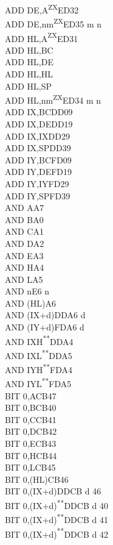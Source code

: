 \documentclass[12pt,twoside,openright,a4paper]{book}
\newcommand{\UNDOC}{\textnormal{\textsuperscript{**}}}
\newcommand{\ZXN}{\textnormal{\textsuperscript{ZX}}}
\begin{document}
\begin{multicols}{3}
{\begin{tabbing}
		ADD DE,A\ZXN\>ED32\\
		ADD DE,nm\ZXN\>ED35 m n\\
		ADD HL,A\ZXN\>ED31\\
		ADD HL,BC\\
		ADD HL,DE\\
		ADD HL,HL\\
		ADD HL,SP\\
		ADD HL,nm\ZXN\>ED34 m n\\
		ADD IX,BC\>DD09\\
		ADD IX,DE\>DD19\\
		ADD IX,IX\>DD29\\
		ADD IX,SP\>DD39\\
		ADD IY,BC\>FD09\\
		ADD IY,DE\>FD19\\
		ADD IY,IY\>FD29\\
		ADD IY,SP\>FD39\\
		AND A\>A7\\
		AND B\>A0\\
		AND C\>A1\\
		AND D\>A2\\
		AND E\>A3\\
		AND H\>A4\\
		AND L\>A5\\
		AND n\>E6 n\\
		AND (HL)\>A6\\
		AND (IX+d)\>DDA6 d\\
		AND (IY+d)\>FDA6 d\\
		AND IXH\UNDOC\>DDA4\\
		AND IXL\UNDOC\>DDA5\\
		AND IYH\UNDOC\>FDA4\\
		AND IYL\UNDOC\>FDA5\\
		BIT 0,A\>CB47\\
		BIT 0,B\>CB40\\
		BIT 0,C\>CB41\\
		BIT 0,D\>CB42\\
		BIT 0,E\>CB43\\
		BIT 0,H\>CB44\\
		BIT 0,L\>CB45\\
		BIT 0,(HL)\>CB46\\
		BIT 0,(IX+d)\>DDCB d 46\\
		BIT 0,(IX+d)\UNDOC\>DDCB d 40\\
		BIT 0,(IX+d)\UNDOC\>DDCB d 41\\
		BIT 0,(IX+d)\UNDOC\>DDCB d 42\\

\end{tabbing}}
\end{multicols}
\end{document}
